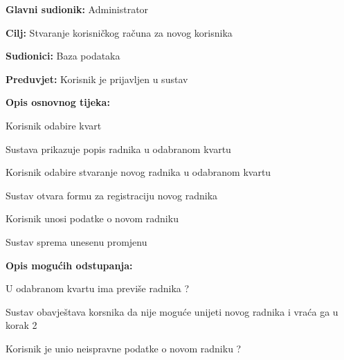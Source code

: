 	\noindent {}
					\begin{packed_item}
	
						\item \textbf{Glavni sudionik: }Administrator
						\item  \textbf{Cilj:} Stvaranje korisničkog računa za novog korisnika
						\item  \textbf{Sudionici:} Baza podataka
						\item  \textbf{Preduvjet:} Korisnik je prijavljen u sustav
						\item  \textbf{Opis osnovnog tijeka:}
						
						\item[] \begin{packed_enum}
	
							\item Korisnik odabire kvart
							\item Sustava prikazuje popis radnika u odabranom kvartu
							\item Korisnik odabire stvaranje novog radnika u odabranom kvartu
							\item Sustav otvara formu za registraciju novog radnika
							\item Korisnik unosi podatke o novom radniku
							\item Sustav sprema unesenu promjenu
						\end{packed_enum}
						
						\item  \textbf{Opis mogućih odstupanja:}
						
						\item[] \begin{packed_item}
	
							\item[3.a] U odabranom kvartu ima previše radnika ?
							
							\item[] \begin{packed_enum}
								
								\item Sustav obavještava korsnika da nije moguće unijeti novog radnika i vraća ga u korak 2
								
							\end{packed_enum}
							\item[5. a] Korisnik je unio neispravne podatke o novom radniku ?
							
								\item[] \begin{packed_enum}
								

\end{packed_enum}
\end{packed_item}
\end{packed_item}
